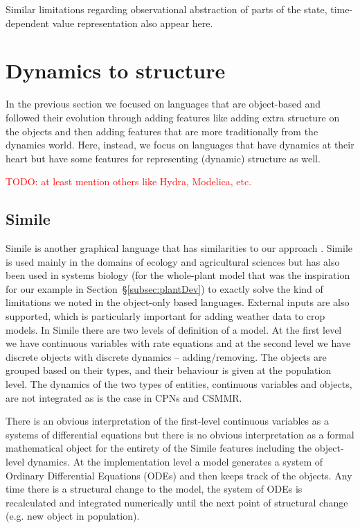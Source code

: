 \documentclass[phd]{infthesis}
\newcommand{\eg}{e.g.\xspace}
\newcommand{\ssec}[1]{\S\ref{subsec:#1}}
\newcommand{\todo}[1]{\textcolor{red}{TODO: #1}}
\begin{document}
Similar limitations regarding observational abstraction of parts of the state,
time-dependent value representation also appear here.

\section{Dynamics to structure}
\label{sec:dyns}
In the previous section we focused on languages that are object-based and
followed their evolution through adding features like adding extra structure on
the objects and then adding features that are more traditionally from the
dynamics world. Here, instead, we focus on languages that have dynamics at their
heart but have some features for representing (dynamic) structure as well.

\todo{at least mention others like Hydra, Modelica, etc.}

\subsection{Simile}
\label{subsec:simile}
Simile is another graphical language that has similarities to our approach
\citep{muetzelfeldt_simile_2003}. Simile is used mainly in the domains of
ecology and agricultural sciences but has also been used in systems biology (for
the whole-plant model \citep{chew_multiscale_2014} that was the inspiration for
our example in Section~\ssec{plantDev}) to exactly solve the kind of limitations
we noted in the object-only based languages. External inputs are also supported,
which is particularly important for adding weather data to crop models. In
Simile there are two levels of definition of a model. At the first level we have
continuous variables with rate equations and at the second level we have
discrete objects with discrete dynamics -- adding/removing. The objects are
grouped based on their types, and their behaviour is given at the population
level. The dynamics of the two types of entities, continuous variables and objects, are
not integrated as is the case in CPNs and CSMMR.

There is an obvious interpretation of the first-level continuous variables as a
systems of differential equations but there is no obvious interpretation as a
formal mathematical object for the entirety of the Simile features including the
object-level dynamics. At the implementation level a model generates a system of
Ordinary Differential Equations (ODEs) and then keeps track of the objects. Any
time there is a structural change to the model, the system of ODEs is
recalculated and integrated numerically until the next point of structural
change (\eg new object in population).
\end{document}
